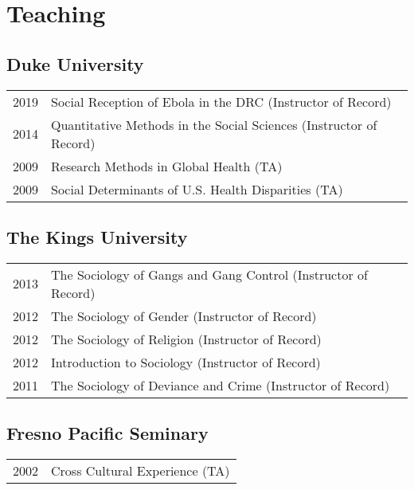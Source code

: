 \section*{Teaching}
\subsection*{Duke University}

\begin{tabular}{p{} p{}}
2019 & Social Reception of Ebola in the DRC (Instructor of Record) \\
2014 & Quantitative Methods in the Social Sciences (Instructor of Record)\\
2009 & Research Methods in Global Health (TA) \\
2009 & Social Determinants of U.S. Health Disparities (TA)\\
\end{tabular}

\subsection*{The Kings University}

\begin{tabular}{p{} p{}}
2013 & The Sociology of Gangs and Gang Control (Instructor of Record)\\
2012 & The Sociology of Gender (Instructor of Record)\\
2012 & The Sociology of Religion (Instructor of Record)\\
2012 & Introduction to Sociology (Instructor of Record)\\
2011 & The Sociology of Deviance and Crime (Instructor of Record)\\
\end{tabular}

\subsection*{Fresno Pacific Seminary}

\begin{tabular}{p{} p{}}
2002 & Cross Cultural Experience (TA) \\
\end{tabular}
